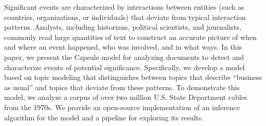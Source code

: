 Significant events are characterized by interactions between entities (such as countries, organizations, or individuals) that deviate from typical interaction patterns. Analysts, including historians, political scientists, and journalists, commonly read large quantities of text to construct an accurate picture of when and where an event happened, who was involved, and in what ways. In this paper, we present the Capsule model for analyzing documents to detect and characterize events of potential significance. Specifically, we develop a model based on topic modeling that distinguishes between topics that describe ``business as usual'' and topics that deviate from these patterns. To demonstrate this model, we analyze a corpus of over two million U.S. State Department cables from the 1970s. We provide an open-source implementation of an inference algorithm for the model and a pipeline for exploring its results.
